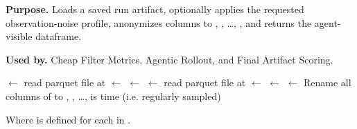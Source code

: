 \documentclass[11pt]{article}
\begin{document}
\begin{algorithm}[H]
  \caption{}
\label{def:materialize-utility}
\textbf{Purpose.} Loads a saved run artifact, optionally applies the requested observation-noise profile, anonymizes columns to , , \ldots, , and returns the agent-visible dataframe.

\textbf{Used by.} Cheap Filter Metrics, Agentic Rollout, and Final Artifact Scoring.
\par\smallskip
\begin{algorithmic}[1]
\State {} $\gets$ read parquet file at 
\State {} $\gets$ 
\State {} $\gets$ 
    \State {} $\gets$ read parquet file at 
\EndIf
{}
    \State {} $\gets$ 
    \State {} $\gets$ 
\Else
    \State {} $\gets$ 
\EndIf
\State Rename all columns of  to , , \ldots, 
\Assert {} is time (i.e. regularly sampled)
\State \Return {}
\end{algorithmic}
\end{algorithm}

Where  is defined for each \termSimulator in .
\end{document}
